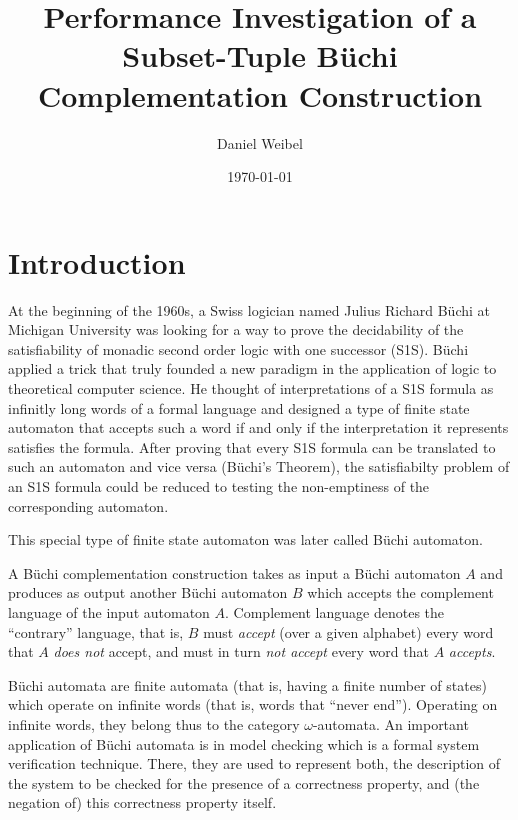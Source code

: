 \documentclass[a4paper]{report}
\newcommand{\om}{{$\omega$}}
\begin{document}
\title{Performance Investigation of a Subset-Tuple Büchi Complementation Construction}
\author{Daniel Weibel}
\date{\today}
\maketitle


\tableofcontents

\chapter{Introduction}
At the beginning of the 1960s, a Swiss logician named Julius Richard Büchi at Michigan University was looking for a way to prove the decidability of the satisfiability of monadic second order logic with one successor (S1S). Büchi applied a trick that truly founded a new paradigm in the application of logic to theoretical computer science. He thought of interpretations of a S1S formula as infinitly long words of a formal language and designed a type of finite state automaton that accepts such a word if and only if the interpretation it represents satisfies the formula. After proving that every S1S formula can be translated to such an automaton and vice versa (Büchi's Theorem), the satisfiabilty problem of an S1S formula could be reduced to testing the non-emptiness of the corresponding automaton.

This special type of finite state automaton was later called Büchi automaton.

A Büchi complementation construction takes as input a Büchi automaton $A$ and produces as output another Büchi automaton $B$ which accepts the complement language of the input automaton $A$. Complement language denotes the ``contrary'' language, that is, $B$ must \emph{accept} (over a given alphabet) every word that $A$ \emph{does not} accept, and must in turn \emph{not accept} every word that $A$ \emph{accepts}.

Büchi automata are finite automata (that is, having a finite number of states) which operate on infinite words (that is, words that ``never end''). Operating on infinite words, they belong thus to the category \om-automata. An important application of Büchi automata is in model checking which is a formal system verification technique. There, they are used to represent both, the description of the system to be checked for the presence of a correctness property, and (the negation of) this correctness property itself.
\end{document}
